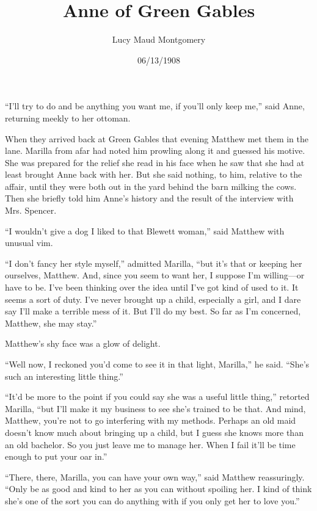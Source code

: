 \documentclass[a4paper]{article}
\title{Anne of Green Gables}
\author{Lucy Maud Montgomery}
\date{06/13/1908}
\begin{document}
\maketitle



``I'll try to do and be anything you want me, if you'll only keep me,'' said Anne, returning meekly to her ottoman.

When they arrived back at Green Gables that evening Matthew met them in the lane. Marilla from afar had noted him prowling along it and guessed his motive. She was prepared for the relief she read in his face when he saw that she had at least brought Anne back with her. But she said nothing, to him, relative to the affair, until they were both out in the yard behind the barn milking the cows. Then she briefly told him Anne's history and the result of the interview with Mrs. Spencer.

``I wouldn't give a dog I liked to that Blewett woman,'' said Matthew with unusual vim.

``I don't fancy her style myself,'' admitted Marilla, ``but it's that or keeping her ourselves, Matthew. And, since you seem to want her, I suppose I'm willing---or have to be. I've been thinking over the idea until I've got kind of used to it. It seems a sort of duty. I've never brought up a child, especially a girl, and I dare say I'll make a terrible mess of it. But I'll do my best. So far as I'm concerned, Matthew, she may stay.''

Matthew's shy face was a glow of delight.

``Well now, I reckoned you'd come to see it in that light, Marilla,'' he said. ``She's such an interesting little thing.''

``It'd be more to the point if you could say she was a useful little thing,'' retorted Marilla, ``but I'll make it my business to see she's trained to be that. And mind, Matthew, you're not to go interfering with my methods. Perhaps an old maid doesn't know much about bringing up a child, but I guess she knows more than an old bachelor. So you just leave me to manage her. When I fail it'll be time enough to put your oar in.''

``There, there, Marilla, you can have your own way,'' said Matthew reassuringly. ``Only be as good and kind to her as you can without spoiling her. I kind of think she's one of the sort you can do anything with if you only get her to love you.''
\end{document}
